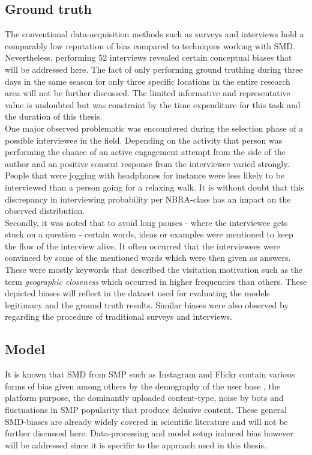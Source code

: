 \subsection*{Ground truth}
The conventional data-acquisition methods such as surveys and interviews hold a comparably low reputation of bias compared to techniques working with SMD. Nevertheless, performing 52 interviews revealed certain conceptual biases that will be addressed here. The fact of only performing ground truthing during three days in the same season for only three specific locations in the entire research area will not be further discussed. The limited informative and representative value is undoubted but was constraint by the time expenditure for this task and the duration of this thesis. \\
One major observed problematic was encountered during the selection phase of a possible interviewee in the field. Depending on the activity that person was performing the chance of an active engagement attempt from the side of the author and an positive consent response from the interviewee varied strongly. People that were jogging with headphones for instance were less likely to be interviewed than a person going for a relaxing walk. It is without doubt that this discrepancy in interviewing probability per NBRA-class has an impact on the observed distribution.\\
Secondly, it was noted that to avoid long pauses - where the interviewee gets stuck on a question - certain words, ideas or examples were mentioned to keep the flow of the interview alive. It often occurred that the interviewees were convinced by some of the mentioned words which were then given as answers. These were mostly keywords that described the visitation motivation such as the term \textit{geographic closeness} which occurred in higher frequencies than others. These depicted biases will reflect in the dataset used for evaluating the models legitimacy and the ground truth results. Similar biases were also observed by \textcite{Hanemann2011, Kling2012, Tenerelli2016} regarding the procedure of traditional surveys and interviews.

\subsection*{Model}
It is known that SMD from SMP such as Instagram and Flickr contain various forms of bias given among others by the demography of the user base \parencite{Heikinheimo2017}, the platform purpose, the dominantly uploaded content-type, noise by bots \parencite{Edwards2014} and fluctuations in SMP popularity that produce delusive content. These general SMD-biases are already widely covered in scientific literature \parencite{Ruths2014, Lazer2014, Zook2017} and will not be further discussed here. Data-processing and model setup induced bias however will be addressed since it is specific to the approach used in this thesis. \\


